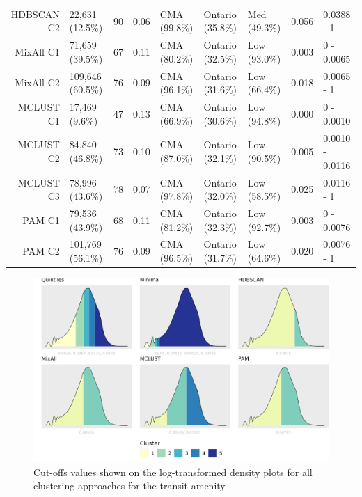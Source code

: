 \documentclass[11pt, a4paper]{article}
\begin{document}
\begin{table}[H]
{\begin{tabular}{|r|llllllll|}
\rowcolor{gray!25}  HDBSCAN C2 & 22,631 (12.5\%) & 90 & 0.06 & CMA (99.8\%) & Ontario (35.8\%) & Med (49.3\%) & 0.056 & 0.0388 - 1 \\
  MixAll C1 & 71,659 (39.5\%) & 67 & 0.11 & CMA (80.2\%) & Ontario (32.5\%) & Low (93.0\%) & 0.003 & 0 - 0.0065 \\
  MixAll C2 & 109,646 (60.5\%) & 76 & 0.09 & CMA (96.1\%) & Ontario (31.6\%) & Low (66.4\%) & 0.018 & 0.0065 - 1 \\
\rowcolor{gray!25}  MCLUST C1 & 17,469 (9.6\%) & 47 & 0.13 & CMA (66.9\%) & Ontario (30.6\%) & Low (94.8\%) & 0.000 & 0 - 0.0010 \\
\rowcolor{gray!25}  MCLUST C2 & 84,840 (46.8\%) & 73 & 0.10 & CMA (87.0\%) & Ontario (32.1\%) & Low (90.5\%) & 0.005 & 0.0010 - 0.0116 \\
\rowcolor{gray!25}  MCLUST C3 & 78,996 (43.6\%) & 78 & 0.07 & CMA (97.8\%) & Ontario (32.0\%) & Low (58.5\%) & 0.025 & 0.0116 - 1 \\
  PAM C1 & 79,536 (43.9\%) & 68 & 0.11 & CMA (81.2\%) & Ontario (32.3\%) & Low (92.7\%) & 0.003 & 0 - 0.0076 \\
  PAM C2 & 101,769 (56.1\%) & 76 & 0.09 & CMA (96.5\%) & Ontario (31.7\%) & Low (64.6\%) & 0.020 & 0.0076 - 1 \\
   \hline
\end{tabular}
}
\end{table}





\begin{figure}[H]
\centering
\includegraphics[width=\textwidth]{./cutoffs/by_amenity/Transit_cutoffs.png}
\caption[Transit cutoffs]{Cut-offs values shown on the log-transformed density plots for all clustering approaches for the transit amenity.}\label{transitcutoffs}
\end{figure}
\end{document}
